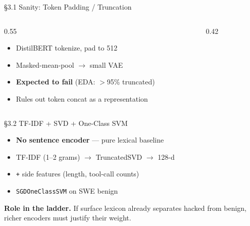 \documentclass{beamer}
\begin{document}
\begin{frame}{\S3.1 Sanity: Token Padding / Truncation}

\begin{columns}[c,onlytextwidth]
\begin{column}{0.55\textwidth}
\begin{itemize}\setlength\itemsep{4pt}
  \item DistilBERT tokenize, pad to 512
  \item Masked-mean-pool $\to$ small VAE
  \item \textbf{Expected to fail} (EDA: $>$95\% truncated)
  \item Rules out token concat as a representation
\end{itemize}
\end{column}

\begin{column}{0.42\textwidth}
\centering
{}
\end{column}
\end{columns}

\end{frame}

\begin{frame}{\S3.2 TF-IDF + SVD + One-Class SVM}

\vspace{0.15cm}

\begin{itemize}\setlength\itemsep{5pt}
  \item \textbf{No sentence encoder} --- pure lexical baseline
  \item TF-IDF (1--2 grams) $\to$ TruncatedSVD $\to$ 128-d
  \item \texttt{+} side features (length, tool-call counts)
  \item \texttt{SGDOneClassSVM} on SWE benign
\end{itemize}

\vspace{0.35cm}

\textbf{Role in the ladder.}
If surface lexicon already separates hacked from benign, richer encoders
must justify their weight.

\end{frame}
\end{document}
